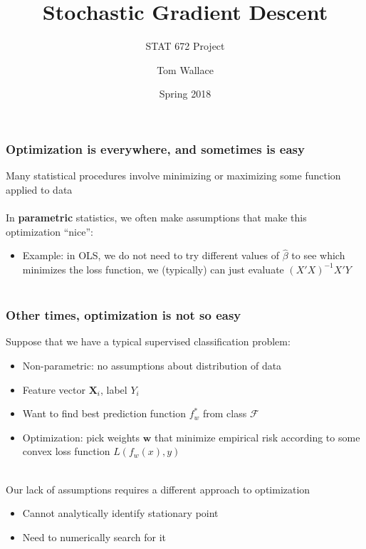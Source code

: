 \documentclass{beamer}
\title{Stochastic Gradient Descent}
\subtitle{STAT 672 Project}
\author{Tom Wallace}
\institute{George Mason University}
\date{Spring 2018}
\begin{document}
\frame{\titlepage}


\begin{frame}
	\frametitle{Optimization is everywhere, and sometimes is easy}
	Many statistical procedures involve minimizing or maximizing some function 
	applied to data \\~\\

	In \textbf{parametric} statistics, we often make assumptions that make this optimization ``nice'':
	\begin{itemize}
		\item \small Example: in OLS, we do not need to try
			different values
			of $\hat{\beta}$ to see which minimizes the loss
			function, we (typically) can just evaluate
			$(X'X)^{-1}X'Y$ \\~\\
	\end{itemize}
	\smallskip

	\centering
\end{frame}

\begin{frame}
	\frametitle{Other times, optimization is not so easy}
	Suppose that we have a typical supervised classification problem:
	\begin{itemize}
		\item \small Non-parametric: no assumptions about distribution of data
		\item Feature vector $\mathbf{X}_i$, label $Y_i$
		\item Want to find best prediction function $f_w^*$ from class $\mathcal{F}$
		\item Optimization: pick weights $\bm{w}$ that minimize
			empirical risk according to some convex
			loss function $L(f_w(x), y)$ \\~\\
	\end{itemize}

	Our lack of assumptions requires a different approach to optimization
	\begin{itemize}
		\item \small Cannot analytically identify stationary point
		\item Need to numerically search for it
	\end{itemize}
\end{frame}
\end{document}
